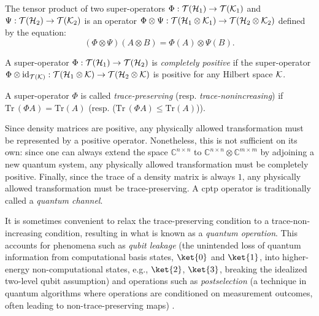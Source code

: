 \begin{definition}
  The tensor product of two super-operators 
  $\Phi: \mathcal{T}(\mathcal{H}_1) \rightarrow \mathcal{T}(\mathcal{K}_1) $ 
  and
  $\Psi : \mathcal{T}(\mathcal{H}_2) \rightarrow \mathcal{T}(\mathcal{K}_2)$ 
  is an operator 
  $ \Phi \otimes \Psi:  \mathcal{T}(\mathcal{H}_1 \otimes \mathcal{K}_1) \rightarrow \mathcal{T}(\mathcal{H}_2 \otimes \mathcal{K}_2)$ 
  defined by the equation:
\begin{equation*}
  (\Phi \otimes \Psi)(A \otimes B) = \Phi (A) \otimes \Psi(B).
\end{equation*}
\end{definition}

\begin{definition} \label{def:completely_positive_superoperator}
  A super-operator $ \Phi : \mathcal{T}(\mathcal{H}_1) \to \mathcal{T}(\mathcal{H}_2)$ is \emph{completely positive} if the super-operator
$\Phi \otimes \mathrm{id}_{\mathcal{T}(\mathcal{K})}: \mathcal{T}(\mathcal{H}_1 \otimes \mathcal{K}) \to \mathcal{T}(\mathcal{H}_2 \otimes \mathcal{K}) $ is positive for any Hilbert space $\mathcal{K}$.
\end{definition}


\begin{definition} \label{def:trace_preserving_superoperator}
  A super-operator $\Phi$ is called \emph{trace-preserving} (resp. \emph{trace-nonincreasing}) if $\text{Tr} \hspace{2pt} (\Phi A)= \text{Tr} (A) $ (resp. ($\text{Tr} \hspace{2pt} (\Phi A)\leq \text{Tr} (A)$)).
\end{definition}

Since density matrices are positive, any physically allowed transformation must be represented by a positive operator. Nonetheless, this is not sufficient on its own: since one can always extend the space $\mathbb{C}^{n \times n}$ to  $\mathbb{C}^{n \times n} \otimes \mathbb{C}^{m \times m} $ by adjoining a new quantum system, any physically allowed transformation must be completely positive. Finally, since the trace of a density matrix is always $1$, any physically allowed transformation must be trace-preserving. A \acrfull{cptp} operator is traditionally called a \emph{quantum channel}.


It is sometimes convenient to relax the trace-preserving condition to a trace-non-increasing condition, resulting in what is known as a \emph{quantum operation}. This accounts for phenomena such as \emph{qubit leakage} (the unintended loss of quantum information from computational basis states, $\ket{0}$ and $\ket{1}$, into higher-energy non-computational states, e.g., $\ket{2}$, $\ket{3}$, breaking the idealized two-level qubit assumption) and operations such as \emph{postselection} (a technique in quantum algorithms where operations are conditioned on measurement outcomes, often leading to non-trace-preserving maps) \cite{Yu_trace_non_inc}.



